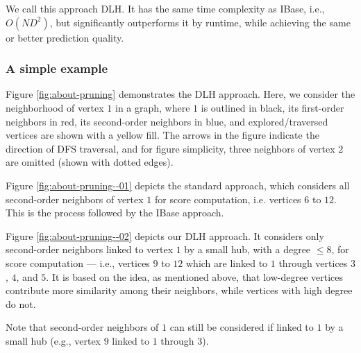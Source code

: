 We call this approach DLH. It has the same time complexity as IBase, i.e., $O(ND^2)$, but significantly outperforms it by runtime, while achieving the same or better prediction quality.


\subsubsection{A simple example}

Figure \ref{fig:about-pruning} demonstrates the DLH approach. Here, we consider the neighborhood of vertex $1$ in a graph, where $1$ is outlined in black, its first-order neighbors in red, its second-order neighbors in blue, and explored/traversed vertices are shown with a yellow fill. The arrows in the figure indicate the direction of DFS traversal, and for figure simplicity, three neighbors of vertex $2$ are omitted (shown with dotted edges).


Figure \ref{fig:about-pruning--01} depicts the standard approach, which considers all second-order neighbors of vertex $1$ for score computation, i.e. vertices $6$ to $12$. This is the process followed by the IBase approach.


Figure \ref{fig:about-pruning--02} depicts our DLH approach. It considers only second-order neighbors linked to vertex $1$ by a small hub, with a degree $\leq 8$, for score computation --- i.e., vertices $9$ to $12$ which are linked to $1$ through vertices $3$, $4$, and $5$. It is based on the idea, as mentioned above, that low-degree vertices contribute more similarity among their neighbors, while vertices with high degree do not. Note that second-order neighbors of $1$ can still be considered if linked to $1$ by a small hub (e.g., vertex $9$ linked to $1$ through $3$).


